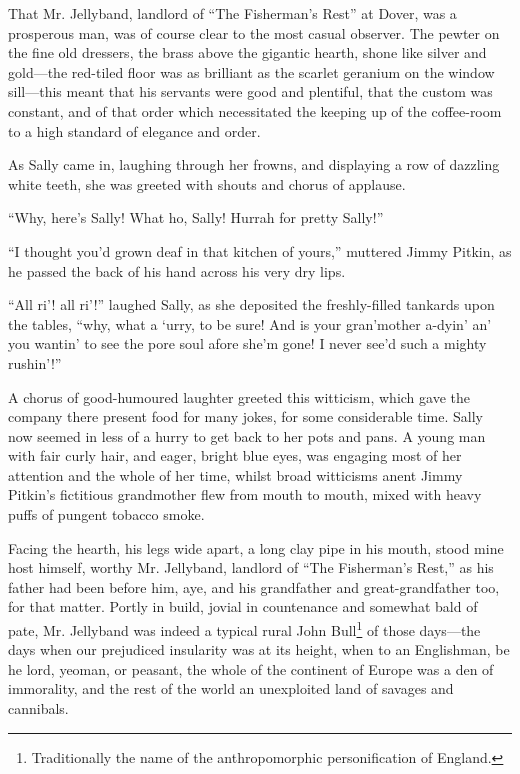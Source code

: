 \documentclass[paper=5.5in:8.5in,BCOR=7mm,twoside,DIV=calc,12pt,usegeometry,chapterprefix,endperiod,headings=big]{scrbook}
\begin{document}
That Mr. Jellyband, landlord of \enquote{The Fisherman's Rest} at Dover, was a prosperous man, was of course clear to the most casual observer. The pewter on the fine old dressers, the brass above the gigantic hearth, shone like silver and gold---the red-tiled floor was as brilliant as the scarlet geranium on the window sill---this meant that his servants were good and plentiful, that the custom was constant, and of that order which necessitated the keeping up of the coffee-room to a high standard of elegance and order.

As Sally came in, laughing through her frowns, and displaying a row of dazzling white teeth, she was greeted with shouts and chorus of applause.

\enquote{Why, here's Sally! What ho, Sally! Hurrah for pretty Sally!}

\enquote{I thought you'd grown deaf in that kitchen of yours,} muttered Jimmy Pitkin, as he passed the back of his hand across his very dry lips.

\enquote{All ri’! all ri’!} laughed Sally, as she deposited the freshly-filled tankards upon the tables, \enquote{why, what a `urry, to be sure! And is your gran'mother a-dyin’ an’ you wantin’ to see the pore soul afore she'm gone! I never see'd such a mighty rushin’!}

A chorus of good-humoured laughter greeted this witticism, which gave the company there present food for many jokes, for some considerable time. Sally now seemed in less of a hurry to get back to her pots and pans. A young man with fair curly hair, and eager, bright blue eyes, was engaging most of her attention and the whole of her time, whilst broad witticisms anent Jimmy Pitkin's fictitious grandmother flew from mouth to mouth, mixed with heavy puffs of pungent tobacco smoke.

Facing the hearth, his legs wide apart, a long clay pipe in his mouth, stood mine host himself, worthy Mr. Jellyband, landlord of \enquote{The Fisherman's Rest,} as his father had been before him, aye, and his grandfather and great-grandfather too, for that matter. Portly in build, jovial in countenance and somewhat bald of pate, Mr. Jellyband was indeed a typical rural John Bull\footnote{Traditionally the name of the anthropomorphic personification of England.} of those days---the days when our prejudiced insularity was at its height, when to an Englishman, be he lord, yeoman, or peasant, the whole of the continent of Europe was a den of immorality, and the rest of the world an unexploited land of savages and cannibals.
\end{document}

